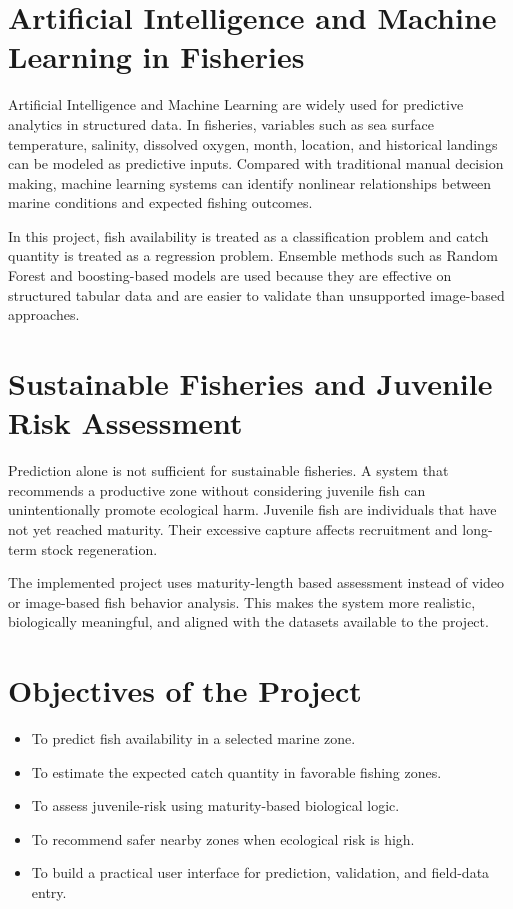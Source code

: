 \documentclass[12pt,a4paper]{report}
\begin{document}
\section{Artificial Intelligence and Machine Learning in Fisheries}
Artificial Intelligence and Machine Learning are widely used for predictive analytics in structured data. In fisheries, variables such as sea surface temperature, salinity, dissolved oxygen, month, location, and historical landings can be modeled as predictive inputs. Compared with traditional manual decision making, machine learning systems can identify nonlinear relationships between marine conditions and expected fishing outcomes.

In this project, fish availability is treated as a classification problem and catch quantity is treated as a regression problem. Ensemble methods such as Random Forest and boosting-based models are used because they are effective on structured tabular data and are easier to validate than unsupported image-based approaches.

\section{Sustainable Fisheries and Juvenile Risk Assessment}
Prediction alone is not sufficient for sustainable fisheries. A system that recommends a productive zone without considering juvenile fish can unintentionally promote ecological harm. Juvenile fish are individuals that have not yet reached maturity. Their excessive capture affects recruitment and long-term stock regeneration.

The implemented project uses maturity-length based assessment instead of video or image-based fish behavior analysis. This makes the system more realistic, biologically meaningful, and aligned with the datasets available to the project.

\section{Objectives of the Project}
\begin{itemize}[leftmargin=1.5cm]
    \item To predict fish availability in a selected marine zone.
    \item To estimate the expected catch quantity in favorable fishing zones.
    \item To assess juvenile-risk using maturity-based biological logic.
    \item To recommend safer nearby zones when ecological risk is high.
    \item To build a practical user interface for prediction, validation, and field-data entry.
\end{itemize}
\end{document}
